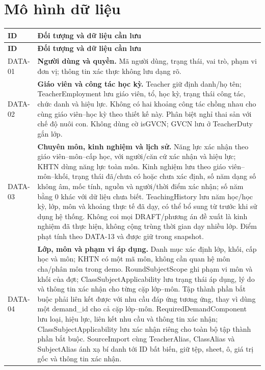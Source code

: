 \documentclass[12pt,a4paper]{report}
\begin{document}
\section{Mô hình dữ liệu}\label{sec:data-model}

\begin{longtable}{|p{1.45cm}|p{12.5cm}|}
\hline
\textbf{ID} & \textbf{Đối tượng và dữ liệu cần lưu} \\\hline
\endfirsthead
\hline
\textbf{ID} & \textbf{Đối tượng và dữ liệu cần lưu} \\\hline
\endhead
DATA-01 & \textbf{Người dùng và quyền.} Mã người dùng, trạng thái, vai trò, phạm vi đơn vị; thông tin xác thực không lưu dạng rõ. \\\hline
DATA-02 & \textbf{Giáo viên và công tác học kỳ.} Teacher giữ định danh/họ tên; TeacherEmployment lưu giáo viên, tổ, học kỳ, trạng thái công tác, chức danh và hiệu lực. Không có hai khoảng công tác chồng nhau cho cùng giáo viên--học kỳ theo thiết kế này. Phân biệt nghỉ thai sản với chế độ nuôi con. Không dùng cờ isGVCN; GVCN lưu ở TeacherDuty gắn lớp. \\\hline
DATA-03 & \textbf{Chuyên môn, kinh nghiệm và lịch sử.} Năng lực xác nhận theo giáo viên--môn--cấp học, với người/căn cứ xác nhận và hiệu lực; KHTN dùng năng lực toàn môn. Kinh nghiệm lưu theo giáo viên--môn--khối, trạng thái đã/chưa có hoặc chưa xác định, số năm dạng số không âm, mốc tính, nguồn và người/thời điểm xác nhận; số năm bằng 0 khác với dữ liệu chưa biết. TeachingHistory lưu năm học/học kỳ, lớp, môn và khoảng thực tế đã dạy, có thể bổ sung từ trước khi sử dụng hệ thống. Không coi mọi DRAFT/phương án đề xuất là kinh nghiệm đã thực hiện, không cộng trùng thời gian dạy nhiều lớp. Điểm phạt tính theo DATA-13 và được giữ trong snapshot. \\\hline
DATA-04 & \textbf{Lớp, môn và phạm vi áp dụng.} Danh mục xác định lớp, khối, cấp học và môn; KHTN có một mã môn, không cần quan hệ môn cha/phân môn trong demo. RoundSubjectScope ghi phạm vi môn và khối của đợt; ClassSubjectApplicability lưu trạng thái áp dụng, lý do và thông tin xác nhận cho từng cặp lớp--môn. Tập thành phần bắt buộc phải liên kết được với nhu cầu đáp ứng tương ứng, thay vì dùng một demand\_id cho cả cặp lớp--môn. RequiredDemandComponent lưu loại, hiệu lực, liên kết nhu cầu và thông tin xác nhận; ClassSubjectApplicability lưu xác nhận riêng cho toàn bộ tập thành phần bắt buộc. SourceImport cùng TeacherAlias, ClassAlias và SubjectAlias ánh xạ bí danh tới ID bất biến, giữ tệp, sheet, ô, giá trị gốc và thông tin xác nhận. \\\hline

\end{longtable}
\end{document}
